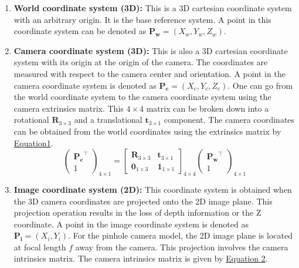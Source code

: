 \begin{enumerate}
    \item \textbf{World coordinate system (3D):} This is a 3D cartesian coordinate system with an arbitrary origin. It is the base reference system. A point in this coordinate system can be denoted as $\mathbf{P_w} = (X_w, Y_w, Z_w)$.
    \item \textbf{Camera coordinate system (3D):}  This is also a 3D cartesian coordinate system with its origin at the origin of the camera. The coordinates are measured with respect to the camera center and orientation. A point in the camera coordinate system is denoted as $\mathbf{P_c} = (X_c, Y_c, Z_c)$. One can go from the world coordinate system to the camera coordinate system using the camera extrinsics matrix. This $4\times4$ matrix can be broken down into a rotational $\mathbf{R}_{3\times3}$ and a translational $\mathbf{t}_{3\times1}$ component. The camera coordinates can be obtained from the world coordinates using the extrinsics matrix by \hyperref[eq:world-to-camera]{Equation1}.
    \begin{equation}
        \begin{pmatrix}
            \mathbf{P_c}^\intercal \\
            1
        \end{pmatrix}_{4\times1}
        = 
        \begin{bmatrix}
            \mathbf{R}_{3\times3} & \mathbf{t}_{3\times1}\\
            \mathbf{0}_{1\times3} & \mathbf{1}_{1\times1}
        \end{bmatrix}_{4\times4}
        \begin{pmatrix}
            \mathbf{P_w}^\intercal \\
            1
        \end{pmatrix}_{4\times1}
    \end{equation}\label{eq:world-to-camera}
\item \textbf{Image coordinate system (2D):} This coordinate system is obtained when the 3D camera coordinates are projected onto the 2D image plane. This projection operation results in the loss of depth information or the Z coordinate. A point in the image coordinate system is denoted as $\mathbf{P_i} = (X_i, Y_i)$. For the pinhole camera model, the 2D image plane is located at focal length $f$ away from the camera. This projection involves the camera intrinsics matrix. The camera intrinsics matrix is given by \hyperref[eq:cam-intrinsic]{Equation 2}.
\begin{equation}

\end{equation}
\end{enumerate}

